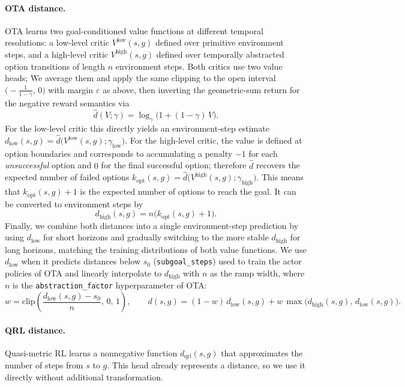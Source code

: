 \documentclass{article} %
\begin{document}
\paragraph{OTA distance.}
OTA learns two goal-conditioned value functions at different temporal resolutions: a low-level critic $V^{\text{low}}(s,g)$ defined over primitive environment steps, and a high-level critic $V^{\text{high}}(s,g)$ defined over temporally abstracted option transitions of length $n$ environment steps. Both critics use two value heads;
We average them and apply the same clipping to the open interval $\bigl(-\tfrac{1}{1-\gamma},\,0\bigr)$ with margin $\varepsilon$ as above, then inverting the geometric-sum return for the negative reward semantics via
\[
\hat d(V;\gamma)=\log_{\gamma}\!\bigl(1+(1-\gamma)\,V\bigr).
\]
For the low-level critic this directly yields an environment-step estimate
$d_{\text{low}}(s,g)=\hat d\!\bigl(V^{\text{low}}(s,g);\gamma_{\text{low}}\bigr)$.
For the high-level critic, the value is defined at option boundaries and corresponds to accumulating a penalty $-1$ for each \emph{unsuccessful} option and $0$ for the final successful option; therefore $\hat d$ recovers the expected number of failed options
$k_{\text{opt}}(s,g)=\hat d\!\bigl(V^{\text{high}}(s,g);\gamma_{\text{high}}\bigr)$.
This means that $k_{\text{opt}}(s,g)+1$ is the expected number of options to reach the goal. It can be converted to environment steps by
\[
d_{\text{high}}(s,g)=n\bigl(k_{\text{opt}}(s,g)+1\bigr).
\]
Finally, we combine both distances into a single environment-step prediction by using $d_{\text{low}}$ for short horizons and gradually switching to the more stable $d_{\text{high}}$ for long horizons, matching the training distributions of both value functions. We use $d_{\text{low}}$ when it predicts distances below $s_0$ (\texttt{subgoal\_steps}) used to train the actor policies of OTA and linearly interpolate to $d_{\text{high}}$ with $n$ as the ramp width, where $n$ is the \texttt{abstraction\_factor} hyperparameter of OTA:
\[
w=\mathrm{clip}\!\left(\frac{d_{\text{low}}(s,g)-s_0}{n},\,0,\,1\right),\qquad
d(s,g)=(1-w)\,d_{\text{low}}(s,g)+w\,\max\!\bigl(d_{\text{high}}(s,g),\,d_{\text{low}}(s,g)\bigr).
\]


\paragraph{QRL distance.}
Quasi-metric RL learns a nonnegative function $d_{\text{qrl}}(s,g)$ that approximates the number of steps from $s$ to $g$. This head already represents a distance, so we use it directly without additional transformation.
\end{document}
